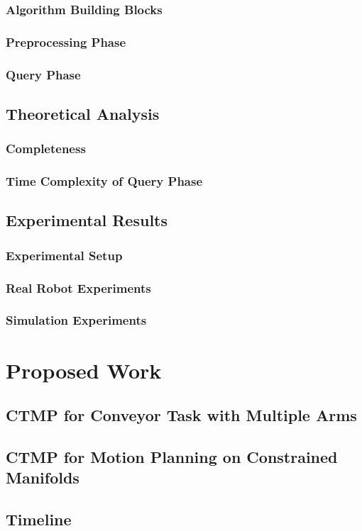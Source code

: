 \documentclass[a4paper,10pt]{article}
\begin{document}
\subsubsection{Algorithm Building Blocks}
\subsubsection{Preprocessing Phase}
\subsubsection{Query Phase}
\subsection{Theoretical Analysis}
\subsubsection{Completeness}
\subsubsection{Time Complexity of Query Phase}
\subsection{Experimental Results}
\subsubsection{Experimental Setup}
\subsubsection{Real Robot Experiments}
\subsubsection{Simulation Experiments}

\section{Proposed Work}
\subsection{CTMP for Conveyor Task with Multiple Arms}
\subsection{CTMP for Motion Planning on Constrained Manifolds}
\subsection{Timeline}




\newpage



\end{document}
